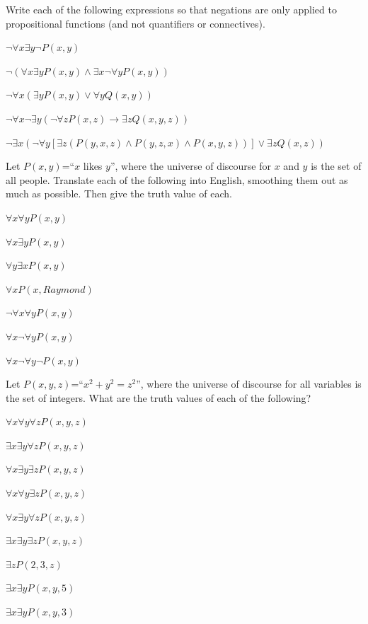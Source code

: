 \begin{pro}
Write each of the following expressions so that negations are only applied to
propositional functions (and not quantifiers or connectives).
\begin{lenum}
\item
$\neg \forall x \exists y \neg P(x,y)$
\item
$\neg (\forall x \exists y P(x,y) \wedge \exists x \neg \forall y P(x,y) )$
\item
$\neg \forall x (\exists y P(x,y) \vee \forall y Q(x,y))$
\item
$\neg \forall x \neg \exists y (\neg \forall z P(x,z) 
\rightarrow \exists z Q(x,y,z))$
\item
$\neg \exists x (\neg \forall y [\exists z ( P(y,x,z) \wedge P(y,z,x)\wedge 
P(x,y,z) ) ] \vee \exists z Q(x,z) )$
\end{lenum}
\end{pro}

\begin{pro}
Let $P(x,y)$=``$x$ likes $y$'', where the universe of discourse for
$x$ and $y$ is the set of all people.
Translate each of the following into English, smoothing them out as much as possible.
Then give the truth value of each.
\begin{lenum}
\item
$\forall x\forall y P(x,y)$
\item
$\forall x\exists y P(x,y)$
\item
$\forall y\exists x P(x,y)$
\item
$\forall x P(x, Raymond)$
\item
$\neg \forall x \forall y P(x,y)$
\item
$\forall x \neg \forall y P(x,y)$
\item
$\forall x \neg \forall y \neg P(x,y)$
\end{lenum}
\end{pro}

\begin{pro}
Let $P(x,y,z)$=``$x^2+y^2=z^2$'', where the universe of discourse for
all variables is the set of integers. 
What are the truth values of each of the following?
\begin{lenum}
\item
$\forall x\forall y\forall z P(x,y,z)$
\item
$\exists x\exists y\forall z P(x,y,z)$
\item
$\forall x\exists y\exists z P(x,y,z)$
\item
$\forall x\forall y\exists z P(x,y,z)$
\item
$\forall x\exists y\forall z P(x,y,z)$
\item
$\exists x\exists y\exists z P(x,y,z)$
\item
$\exists z P(2,3,z)$
\item
$\exists x \exists y P(x,y,5)$
\item
$\exists x \exists y P(x,y,3)$
\end{lenum}
\end{pro}

